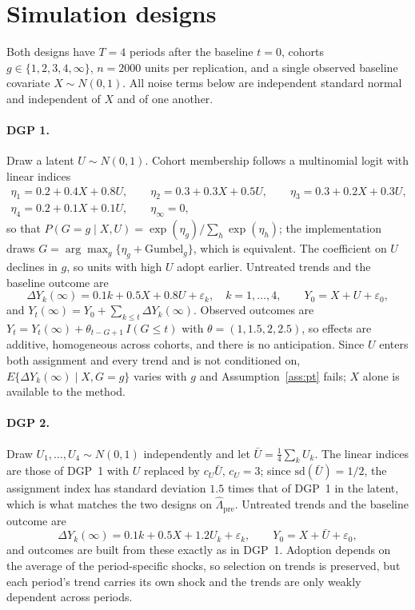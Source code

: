 \documentclass[12pt]{article}
\theoremstyle{remark}
\begin{document}
\section{Simulation designs}
\label{app:sim}

Both designs have $T = 4$ periods after the baseline $t = 0$, cohorts
$g \in \{1, 2, 3, 4, \infty\}$, $n = 2000$ units per replication, and a single observed
baseline covariate $X \sim N(0,1)$. All noise terms below are independent standard normal
and independent of $X$ and of one another.

\paragraph{DGP 1.} Draw a latent $U \sim N(0,1)$. Cohort membership follows a multinomial
logit with linear indices
\begin{gather*}
\eta_1 = 0.2 + 0.4X + 0.8U,\qquad
\eta_2 = 0.3 + 0.3X + 0.5U,\qquad
\eta_3 = 0.3 + 0.2X + 0.3U,\\
\eta_4 = 0.2 + 0.1X + 0.1U,\qquad
\eta_\infty = 0,
\end{gather*}
so that $P(G{=}g \mid X, U) = \exp(\eta_g)/\sum_h \exp(\eta_h)$; the implementation draws
$G = \arg\max_g\{\eta_g + \text{Gumbel}_g\}$, which is equivalent. The coefficient on $U$
declines in $g$, so units with high $U$ adopt earlier. Untreated trends and the baseline
outcome are
\[
\Delta Y_k(\infty) = 0.1k + 0.5X + 0.8U + \varepsilon_k,\quad k = 1, \ldots, 4,
\qquad
Y_0 = X + U + \varepsilon_0,
\]
and $Y_t(\infty) = Y_0 + \sum_{k \le t}\Delta Y_k(\infty)$. Observed outcomes are
$Y_t = Y_t(\infty) + \theta_{t-G+1}\,I(G \le t)$ with
$\theta = (1, 1.5, 2, 2.5)$, so effects are additive, homogeneous across cohorts, and
there is no anticipation. Since $U$ enters both assignment and every trend and is not
conditioned on, $E\{\Delta Y_k(\infty) \mid X, G{=}g\}$ varies with $g$ and
Assumption~\ref{ass:pt} fails; $X$ alone is available to the method.

\paragraph{DGP 2.} Draw $U_1, \ldots, U_4 \sim N(0,1)$ independently and let
$\bar U = \frac14\sum_k U_k$. The linear indices are those of DGP~1 with $U$ replaced by
$c_U \bar U$, $c_U = 3$; since $\mathrm{sd}(\bar U) = 1/2$, the assignment index has
standard deviation $1.5$ times that of DGP~1 in the latent, which is what matches the two
designs on $\widehat\Lambda_{\mathrm{pre}}$. Untreated trends and the baseline outcome are
\[
\Delta Y_k(\infty) = 0.1k + 0.5X + 1.2U_k + \varepsilon_k,
\qquad
Y_0 = X + \bar U + \varepsilon_0,
\]
and outcomes are built from these exactly as in DGP~1. Adoption depends on the average of
the period-specific shocks, so selection on trends is preserved, but each period's trend
carries its own shock and the trends are only weakly dependent across periods.
\end{document}
